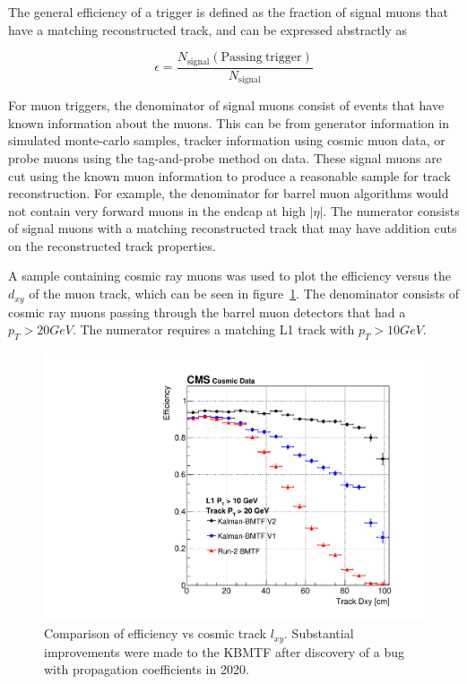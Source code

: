 The general efficiency of a trigger is defined as the fraction of signal muons that have a matching reconstructed track, and can be expressed abstractly as

\begin{equation}\label{eq:eff}
	\epsilon=\frac{N_\mathrm{signal}(\mathrm{Passing\ trigger})}{N_\mathrm{signal}}	
\end{equation}

For muon triggers, the denominator of signal muons consist of events that have known information about the muons. This can be from generator information in simulated monte-carlo samples, tracker information using cosmic muon data, or probe muons using the tag-and-probe method on data. These signal muons are cut using the known muon information to produce a reasonable sample for track reconstruction. For example, the denominator for barrel muon algorithms would not contain very forward muons in the endcap at high $|\eta|$. The numerator consists of signal muons with a matching reconstructed track that may have addition cuts on the reconstructed track properties.

A sample containing cosmic ray muons was used to plot the efficiency versus the $d_{xy}$ of the muon track, which can be seen in figure~\ref{fig:effVsDxy_kmtf}. The denominator consists of cosmic ray muons passing through the barrel muon detectors that had a $p_T>20\unit{GeV}$. The numerator requires a matching L1 track with $p_T>10\unit{GeV}$. 

\begin{figure}
	\centering
	\includegraphics[width=0.85\linewidth]{figs/04_muons/effVsDxy_kmtf.pdf}
	\caption[Comparison of efficiency vs cosmic track $l_{xy}$ using cosmic data from the 2018 data taking run. Substantial improvements were made to the KBMTF after discovery of a bug with propagation coefficients in 2020.]{Comparison of efficiency vs cosmic track $l_{xy}$. Substantial improvements were made to the KBMTF after discovery of a bug with propagation coefficients in 2020.}
	\label{fig:effVsDxy_kmtf}
\end{figure}